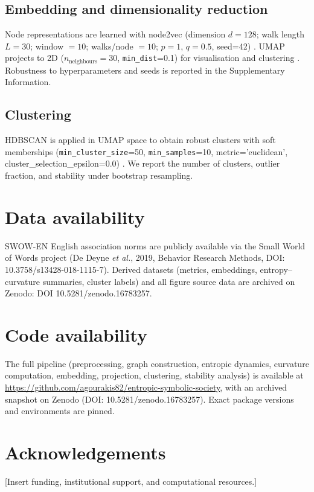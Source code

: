 \documentclass[fleqn,10pt]{wlscirep}
\begin{document}
\subsection*{Embedding and dimensionality reduction}
Node representations are learned with node2vec (dimension $d=128$; walk length $L=30$; window $=10$; walks/node $=10$; $p=1$, $q=0.5$, seed=42) \cite{Grover2016node2vec}. UMAP projects to 2D ($n_{\mathrm{neighbours}}=30$, \texttt{min\_dist}=0.1) for visualisation and clustering \cite{McInnes2018UMAP}. Robustness to hyperparameters and seeds is reported in the Supplementary Information.

\subsection*{Clustering}
HDBSCAN is applied in UMAP space to obtain robust clusters with soft memberships (\texttt{min\_cluster\_size}=50, \texttt{min\_samples}=10, metric='euclidean', cluster\_selection\_epsilon=0.0) \cite{Campello2015}. We report the number of clusters, outlier fraction, and stability under bootstrap resampling.

\section*{Data availability}
SWOW-EN English association norms are publicly available via the Small World of Words project (De Deyne \emph{et al.}, 2019, Behavior Research Methods, DOI: 10.3758/s13428-018-1115-7). Derived datasets (metrics, embeddings, entropy--curvature summaries, cluster labels) and all figure source data are archived on Zenodo: DOI 10.5281/zenodo.16783257.

\section*{Code availability}
The full pipeline (preprocessing, graph construction, entropic dynamics, curvature computation, embedding, projection, clustering, stability analysis) is available at \url{https://github.com/agourakis82/entropic-symbolic-society}, with an archived snapshot on Zenodo (DOI: 10.5281/zenodo.16783257). Exact package versions and environments are pinned.

\section*{Acknowledgements}
[Insert funding, institutional support, and computational resources.]
\end{document}
